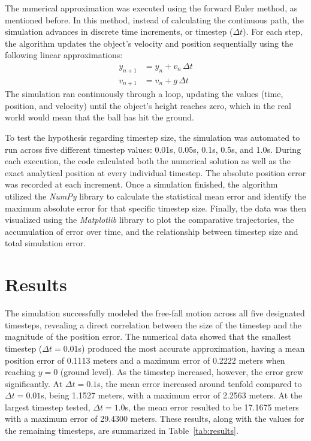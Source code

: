 \documentclass[12pt]{article}
\begin{document}
The numerical approximation was executed using the forward Euler method, as mentioned before. In this method, instead of calculating the continuous path, the simulation advances in discrete time increments, or timestep ($\Delta t$). For each step, the algorithm updates the object's velocity and position sequentially using the following linear approximations:
\begin{align}
y_{n+1} &= y_n + v_n \,\Delta t \label{eq:euler-y}\\
v_{n+1} &= v_n + g \,\Delta t \label{eq:euler-v}
\end{align}
The simulation ran continuously through a loop, updating the values (time, position, and velocity) until the object's height reaches zero, which in the real world would mean that the ball has hit the ground.

To test the hypothesis regarding timestep size, the simulation was automated to run across five different timestep values: 0.01s, 0.05s, 0.1s, 0.5s, and 1.0s. During each execution, the code calculated both the numerical solution as well as the exact analytical position at every individual timestep. The absolute position error was recorded at each increment. Once a simulation finished, the algorithm utilized the \textit{NumPy} library to calculate the statistical mean error and identify the maximum absolute error for that specific timestep size. Finally, the data was then visualized using the \textit{Matplotlib} library to plot the comparative trajectories, the accumulation of error over time, and the relationship between timestep size and total simulation error.

\section{Results}

The simulation successfully modeled the free-fall motion across all five designated timesteps, revealing a direct correlation between the size of the timestep and the magnitude of the position error. The numerical data showed that the smallest timestep ($\Delta t = 0.01$s) produced the most accurate approximation, having a mean position error of 0.1113 meters and a maximum error of 0.2222 meters when reaching $y=0$ (ground level). As the timestep increased, however, the error grew significantly. At $\Delta t = 0.1$s, the mean error increased around tenfold compared to $\Delta t = 0.01$s, being 1.1527 meters, with a maximum error of 2.2563 meters. At the largest timestep tested, $\Delta t = 1.0$s, the mean error resulted to be 17.1675 meters with a maximum error of 29.4300 meters. These results, along with the values for the remaining timesteps, are summarized in Table~\ref{tab:results}.
\end{document}
